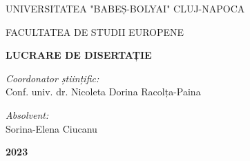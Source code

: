 \documentclass[a4paper, 12pt]{article}
\begin{document}
\begin{titlepage}
	\begin{center}
		\vspace{0.5cm}
		\large {UNIVERSITATEA "BABEȘ-BOLYAI" CLUJ-NAPOCA}
		
		\large {FACULTATEA DE STUDII EUROPENE}
		\\
		
		
		\vspace{6cm}
		
		\Huge \textbf{LUCRARE DE DISERTAȚIE}
		
		\vspace{2 cm}
		
		\vfill
	\end{center}
	
	\begin{flushleft}
		\large{\textit{Coordonator științific:}} \\
		\large{Conf. univ. dr. Nicoleta Dorina Racolța-Paina}
	\end{flushleft}
	
	\begin{flushright}
		\hfill \large {\textit{Absolvent:}} \\
		\hfill \large {Sorina-Elena Ciucanu}
	\end{flushright}
	
	\begin{center}
		\vspace{1.5cm}
		\large \textbf{2023}
	\end{center}
\end{titlepage}
\end{document}
